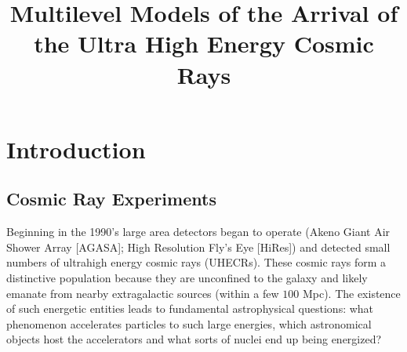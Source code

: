 \documentclass[dvips,aoas]{imsart}
\begin{document}
\begin{frontmatter}

\title{Multilevel Models of the Arrival of the Ultra High Energy Cosmic Rays}


\author{ }
\address{}





\end{frontmatter}

\section{Introduction}
\subsection{Cosmic Ray Experiments}

Beginning in the 1990's large area detectors began to
operate (Akeno Giant Air Shower Array [AGASA]; High
Resolution Fly's Eye [HiRes]) and detected small
numbers of ultrahigh energy cosmic rays (UHECRs). These
cosmic rays form a distinctive population because they
are unconfined to the galaxy and likely emanate from
nearby extragalactic sources (within a few $100$ Mpc).
The existence of such energetic entities leads to
fundamental astrophysical questions: what phenomenon
accelerates particles to such large energies, which
astronomical objects host the accelerators and what
sorts of nuclei end up being energized?
\end{document}
